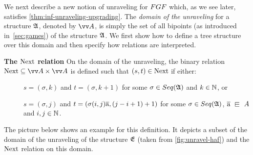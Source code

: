 We next describe a new notion of unraveling for $\FGF$ which, as we see later, satisfies \cref{thm:inf-unraveling-upgrading}.
The \emph{domain of the unraveling} for a structure ${\mathfrak{A}}$, denoted by $\unraveldom{A}$, is simply the set of all bipoints (as introduced in~\ref{sec:games}) of the structure ${\mathfrak{A}}$.
We first show how to define a tree structure over this domain and then specify how relations are interpreted.

\noindent \textbf{The $\mathrm{Next}$ relation}
On the domain of the unraveling, the binary relation $\relNext \subseteq \unraveldom{A} \times \unraveldom{A}$ is defined such that $(s, t) \in \mathrm{Next}$ if either:
\begin{description}
  \item[] $s = (\sigma, k)$ and $t = (\sigma, k + 1)$ for some $\sigma \in \Seq{A}$ and $k \in {\mathbb{N}}$, or
  \item[] $s = (\sigma, j)$ and $t = (\sigma(i,j)\overline{\mathrm{a}}, (j-i+1) + 1)$ for some $\sigma \in \Seq{A}$, $\elemtuplea \sqin A$ and $i,j \in {\mathbb{N}}$.
\end{description}
The picture below shows an example for this definition.
It depicts a subset of the domain of the unraveling of the structure ${\mathfrak{E}}$ (taken from \cref{fig:unravel-haf}) and the $\mathrm{Next}$ relation on this domain.

\begin{figure}[H]
  \centering
  
\end{figure}

